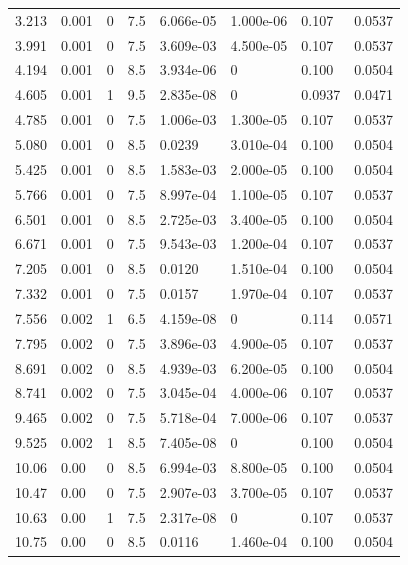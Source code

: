 \documentclass[preview]{standalone}
\begin{document}
{{\begin{tabular}{L{1.2cm}C{1.2cm} C{0.3cm}C{0.5cm} C{1.4cm}C{1.4cm} C{1.4cm}C{1.4cm}}
  3.213  &  0.001  & 0     & 7.5 &  6.066e-05  & 1.000e-06  & 0.107 &  0.0537   \\ 
  3.991  &  0.001  & 0     & 7.5 &  3.609e-03  & 4.500e-05  & 0.107 &  0.0537   \\ 
  4.194  &  0.001  & 0     & 8.5 &  3.934e-06  & 0  & 0.100 &  0.0504   \\ 
  4.605  &  0.001  & 1     & 9.5 &  2.835e-08  & 0  & 0.0937 &  0.0471   \\ 
  4.785  &  0.001  & 0     & 7.5 &  1.006e-03  & 1.300e-05  & 0.107 &  0.0537   \\ 
  5.080  &  0.001  & 0     & 8.5 &  0.0239  & 3.010e-04  & 0.100 &  0.0504   \\ 
  5.425  &  0.001  & 0     & 8.5 &  1.583e-03  & 2.000e-05  & 0.100 &  0.0504   \\ 
  5.766  &  0.001  & 0     & 7.5 &  8.997e-04  & 1.100e-05  & 0.107 &  0.0537   \\ 
  6.501  &  0.001  & 0     & 8.5 &  2.725e-03  & 3.400e-05  & 0.100 &  0.0504   \\ 
  6.671  &  0.001  & 0     & 7.5 &  9.543e-03  & 1.200e-04  & 0.107 &  0.0537   \\ 
  7.205  &  0.001  & 0     & 8.5 &  0.0120  & 1.510e-04  & 0.100 &  0.0504   \\ 
  7.332  &  0.001  & 0     & 7.5 &  0.0157  & 1.970e-04  & 0.107 &  0.0537   \\ 
  7.556  &  0.002  & 1     & 6.5 &  4.159e-08  & 0  & 0.114 &  0.0571   \\ 
  7.795  &  0.002  & 0     & 7.5 &  3.896e-03  & 4.900e-05  & 0.107 &  0.0537   \\ 
  8.691  &  0.002  & 0     & 8.5 &  4.939e-03  & 6.200e-05  & 0.100 &  0.0504   \\ 
  8.741  &  0.002  & 0     & 7.5 &  3.045e-04  & 4.000e-06  & 0.107 &  0.0537   \\ 
  9.465  &  0.002  & 0     & 7.5 &  5.718e-04  & 7.000e-06  & 0.107 &  0.0537   \\ 
  9.525  &  0.002  & 1     & 8.5 &  7.405e-08  & 0  & 0.100 &  0.0504   \\ 
  10.06  &  0.00  & 0     & 8.5 &  6.994e-03  & 8.800e-05  & 0.100 &  0.0504   \\ 
  10.47  &  0.00  & 0     & 7.5 &  2.907e-03  & 3.700e-05  & 0.107 &  0.0537   \\ 
  10.63  &  0.00  & 1     & 7.5 &  2.317e-08  & 0  & 0.107 &  0.0537   \\ 
  10.75  &  0.00  & 0     & 8.5 &  0.0116  & 1.460e-04  & 0.100 &  0.0504   \\ 

\end{tabular}}}
\end{document}
